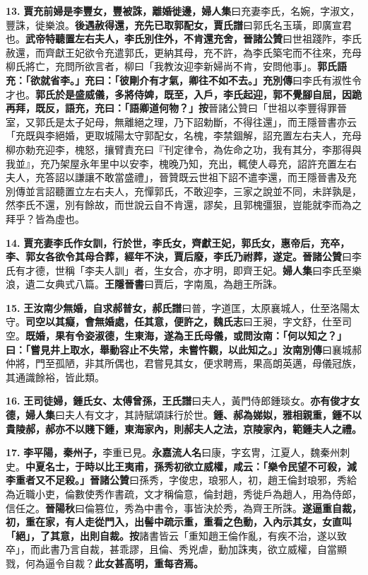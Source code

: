 \textbf{13.} \textbf{賈充前婦是李豐女，豐被誅，離婚徙邊，}{\footnotesize \textbf{婦人集}曰充妻李氏，名婉，字淑文，豐誅，徙樂浪。}\textbf{後遇赦得還，充先已取郭配女，}{\footnotesize \textbf{賈氏譜}曰郭氏名玉璜，即廣宣君也。}\textbf{武帝特聽置左右夫人，李氏別住外，不肯還充舍，}{\footnotesize \textbf{晉諸公贊}曰世祖踐阼，李氏赦還，而齊獻王妃欲令充遣郭氏，更納其母，充不許，為李氏築宅而不往來，充母柳氏將亡，充問所欲言者，柳曰「我教汝迎李新婦尚不肯，安問他事」。}\textbf{郭氏語充：「欲就省李。」充曰：「彼剛介有才氣，卿往不如不去。」}{\footnotesize \textbf{充別傳}曰李氏有淑性令才也。}\textbf{郭氏於是盛威儀，多將侍婢，既至，入戶，李氏起迎，郭不覺腳自屈，因跪再拜，既反，語充，充曰：「語卿道何物？」}{\footnotesize \textbf{按}晉諸公贊曰「世祖以李豐得罪晉室，又郭氏是太子妃母，無離絕之理，乃下詔勅斷，不得往還」，而王隱晉書亦云「充既與李絕婚，更取城陽太守郭配女，名槐，李禁錮解，詔充置左右夫人，充母柳亦勅充迎李，槐怒，攘臂責充曰『刊定律令，為佐命之功，我有其分，李那得與我並』，充乃架屋永年里中以安李，槐晚乃知，充出，輒使人尋充，詔許充置左右夫人，充答詔以謙讓不敢當盛禮」，晉贊既云世祖下詔不遣李還，而王隱晉書及充別傳並言詔聽置立左右夫人，充憚郭氏，不敢迎李，三家之說並不同，未詳孰是，然李氏不還，別有餘故，而世說云自不肯還，謬矣，且郭槐彊狠，豈能就李而為之拜乎？皆為虛也。}

\textbf{14.} \textbf{賈充妻李氏作女訓，行於世，李氏女，齊獻王妃，郭氏女，惠帝后，充卒，李、郭女各欲令其母合葬，經年不決，賈后廢，李氏乃祔葬，遂定。}{\footnotesize \textbf{晉諸公贊}曰李氏有才德，世稱「李夫人訓」者，生女合，亦才明，即齊王妃。\textbf{婦人集}曰李氏至樂浪，遺二女典式八篇。\textbf{王隱晉書}曰賈后，字南風，為趙王所誅。}

\textbf{15.} \textbf{王汝南少無婚，自求郝普女，}{\footnotesize \textbf{郝氏譜}曰普，字道匡，太原襄城人，仕至洛陽太守。}\textbf{司空以其癡，會無婚處，任其意，便許之，}{\footnotesize \textbf{魏氏志}曰王昶，字文舒，仕至司空。}\textbf{既婚，果有令姿淑德，生東海，遂為王氏母儀，或問汝南：「何以知之？」曰：「嘗見井上取水，舉動容止不失常，未嘗忤觀，以此知之。」}{\footnotesize \textbf{汝南別傳}曰襄城郝仲將，門至孤陋，非其所偶也，君嘗見其女，便求聘焉，果高朗英邁，母儀冠族，其通識餘裕，皆此類。}

\textbf{16.} \textbf{王司徒婦，鍾氏女、太傅曾孫，}{\footnotesize \textbf{王氏譜}曰夫人，黃門侍郎鍾琰女。}\textbf{亦有俊才女德，}{\footnotesize \textbf{婦人集}曰夫人有文才，其詩賦頌誄行於世。}\textbf{鍾、郝為娣姒，雅相親重，鍾不以貴陵郝，郝亦不以賤下鍾，東海家內，則郝夫人之法，京陵家內，範鍾夫人之禮。}

\textbf{17.} \textbf{李平陽，秦州子，}{\footnotesize 李重已見。\textbf{永嘉流人名}曰康，字玄冑，江夏人，魏秦州刺史。}\textbf{中夏名士，于時以比王夷甫，孫秀初欲立威權，咸云：「樂令民望不可殺，減李重者又不足殺。」}{\footnotesize \textbf{晉諸公贊}曰孫秀，字俊忠，琅邪人，初，趙王倫封琅邪，秀給為近職小吏，倫數使秀作書疏，文才稱倫意，倫封趙，秀徙戶為趙人，用為侍郎，信任之。\textbf{晉陽秋}曰倫篡位，秀為中書令，事皆決於秀，為齊王所誅。}\textbf{遂逼重自裁，初，重在家，有人走從門入，出髻中疏示重，重看之色動，入內示其女，女直叫「絕」，了其意，出則自裁。}{\footnotesize \textbf{按}諸書皆云「重知趙王倫作亂，有疾不治，遂以致卒」，而此書乃言自裁，甚乖謬，且倫、秀兇虐，動加誅夷，欲立威權，自當顯戮，何為逼令自裁？}\textbf{此女甚高明，重每咨焉。}

